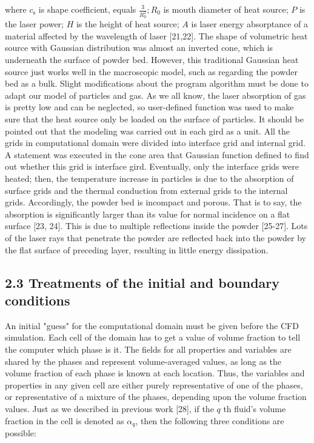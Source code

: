 \documentclass[10pt]{article}
\begin{document}
where $c_{\mathrm{s}}$ is shape coefficient, equals $\frac{3}{R_{0}^{2}} ; R_{0}$ is mouth diameter of heat source; $P$ is the laser power; $H$ is the height of heat source; $A$ is laser energy absorptance of a material affected by the wavelength of laser [21,22]. The shape of volumetric heat source with Gaussian distribution was almost an inverted cone, which is underneath the surface of powder bed. However, this traditional Gaussian heat source just works well in the macroscopic model, such as regarding the powder bed as a bulk. Slight modifications about the program algorithm must be done to adapt our model of particles and gas. As we all know, the laser absorption of gas is pretty low and can be neglected, so user-defined function was used to make sure that the heat source only be loaded on the surface of particles. It should be pointed out that the modeling was carried out in each gird as a unit. All the grids in computational domain were divided into interface grid and internal grid. A statement was executed in the cone area that Gaussian function defined to find out whether this grid is interface gird. Eventually, only the interface grids were heated; then, the temperature increase in particles is due to the absorption of surface grids and the thermal conduction from external grids to the internal grids. Accordingly, the powder bed is incompact and porous. That is to say, the absorption is significantly larger than its value for normal incidence on a flat surface [23, 24]. This is due to multiple reflections inside the powder [25-27]. Lots of the laser rays that penetrate the powder are reflected back into the powder by the flat surface of preceding layer, resulting in little energy dissipation.

\subsection*{2.3 Treatments of the initial and boundary conditions}
An initial "guess" for the computational domain must be given before the CFD simulation. Each cell of the domain has to get a value of volume fraction to tell the computer which phase is it. The fields for all properties and variables are shared by the phases and represent volume-averaged values, as long as the volume fraction of each phase is known at each location. Thus, the variables and properties in any given cell are either purely representative of one of the phases, or representative of a mixture of the phases, depending upon the volume fraction values. Just as we described in previous work [28], if the $q$ th fluid's volume fraction in the cell is denoted as $\alpha_{q}$, then the following three conditions are possible:
\end{document}
